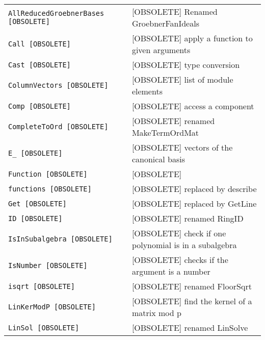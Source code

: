 \documentclass[a4paper]{mybook}
\begin{document}
\begin{center}
\begin{longtable}{ll}
    
{\verb~AllReducedGroebnerBases [OBSOLETE]~} &
      [OBSOLETE] Renamed GroebnerFanIdeals\\
   
{\verb~Call [OBSOLETE]~} &
      [OBSOLETE] apply a function to given arguments\\
   
{\verb~Cast [OBSOLETE]~} &
      [OBSOLETE] type conversion\\
   
{\verb~ColumnVectors [OBSOLETE]~} &
      [OBSOLETE] list of module elements\\
   
{\verb~Comp [OBSOLETE]~} &
      [OBSOLETE] access a component\\
   
{\verb~CompleteToOrd [OBSOLETE]~} &
      [OBSOLETE] renamed MakeTermOrdMat\\
   
{\verb~E_ [OBSOLETE]~} &
      [OBSOLETE] vectors of the canonical basis\\
   
{\verb~Function [OBSOLETE]~} &
      [OBSOLETE]\\
   
{\verb~functions [OBSOLETE]~} &
      [OBSOLETE] replaced by describe\\
   
{\verb~Get [OBSOLETE]~} &
      [OBSOLETE] replaced by GetLine\\
   
{\verb~ID [OBSOLETE]~} &
      [OBSOLETE] renamed RingID\\
   
{\verb~IsInSubalgebra [OBSOLETE]~} &
      [OBSOLETE] check if one polynomial is in a subalgebra\\
   
{\verb~IsNumber [OBSOLETE]~} &
      [OBSOLETE] checks if the argument is a number\\
   
{\verb~isqrt [OBSOLETE]~} &
      [OBSOLETE] renamed FloorSqrt\\
   
{\verb~LinKerModP [OBSOLETE]~} &
      [OBSOLETE] find the kernel of a matrix mod p\\
   
{\verb~LinSol [OBSOLETE]~} &
      [OBSOLETE] renamed LinSolve\\
   

\end{longtable}
\end{center}
\end{document}
